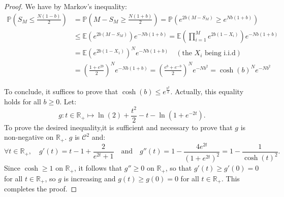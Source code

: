 \documentclass[a4paper,10pt,notitlepage]{report}
\theoremstyle{definition}
\theoremstyle{plain}
\theoremstyle{definition}
\newcommand{\R}{\mathbb{R}}
\newcommand{\E}{\mathbb{E}}
\newcommand{\mC}{\mathcal{C}}
\renewcommand{\(}{\left(}
\renewcommand{\)}{\right)}
\renewcommand{\P}{\mathbb{P}}
\begin{document}
\begin{proof}
We have by Markov's inequality:
\begin{align*}
\P\(S_M\leq\frac{N(1-b)}{2}\)&=\P\(M-S_M\geq\frac{N(1+b)}{2}\)=\P\(e^{2b(M-S_M)}\geq e^{Nb(1+b)}\)\\
&\leq \E\(e^{2b(M-S_M)}\)e^{-Nb(1+b)}= \E\(\prod_{i=1}^M e^{2b(1-X_i)}\)e^{-Nb(1+b)}\\
&=\E(e^{2b(1-X_1)})^Ne^{-Nb(1+b)} \quad (\mbox{the } X_i \mbox{ being i.i.d})\\
&=\(\frac{1+e^{2b}}{2}\)^Ne^{-Nb(1+b)}=\(\frac{e^b+e^{-b}}{2}\)^Ne^{-Nb^2}=\cosh(b)^Ne^{-Nb^2}
\end{align*}

To conclude, it suffices to prove that $\cosh(b)\leq e^{\frac{b^2}{2}}$. Actually, this equality holds for all $b\geq 0$. Let: 
\[g: t\in\R_+\longmapsto \ln(2)+\frac{t^2}{2}-t-\ln\(1+e^{-2t}\).\]
To prove the desired inequality,it is sufficient and necessary to prove that $g$ is non-negative on $\R_+$. $g$ is $\mC^2$ and:
\[\forall t\in\R_+, \quad g'(t)=t-1+\frac{2}{e^{2t}+1} \quad \mbox{and} \quad g''(t)=1-\frac{4e^{2t}}{(1+e^{2t})^2}=1-\frac{1}{\cosh(t)^2}.\]
Since $\cosh\geq 1 $ on $\R_+$, it follows that $g''\geq 0$ on $\R_+$, so that $g'(t)\geq g'(0)=0$ for all $t\in\R_+$, so $g$ is increasing and $g(t)\geq g(0)=0$ for all $t\in\R_+$. This completes the proof.
\end{proof}
\end{document}

